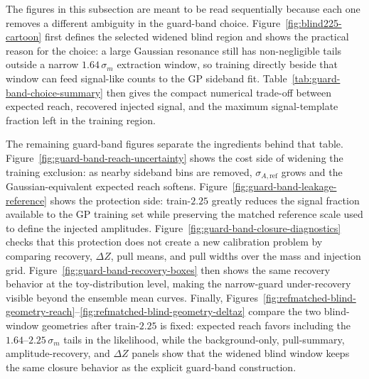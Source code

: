 The figures in this subsection are meant to be read sequentially because each one removes a different ambiguity in the guard-band choice. Figure~\ref{fig:blind225-cartoon} first defines the selected widened blind region and shows the practical reason for the choice: a large Gaussian resonance still has non-negligible tails outside a narrow $1.64\,\sigma_m$ extraction window, so training directly beside that window can feed signal-like counts to the GP sideband fit. Table~\ref{tab:guard-band-choice-summary} then gives the compact numerical trade-off between expected reach, recovered injected signal, and the maximum signal-template fraction left in the training region.

The remaining guard-band figures separate the ingredients behind that table. Figure~\ref{fig:guard-band-reach-uncertainty} shows the cost side of widening the training exclusion: as nearby sideband bins are removed, $\sigma_{A,\mathrm{ref}}$ grows and the Gaussian-equivalent expected reach softens. Figure~\ref{fig:guard-band-leakage-reference} shows the protection side: train-$2.25$ greatly reduces the signal fraction available to the GP training set while preserving the matched reference scale used to define the injected amplitudes. Figure~\ref{fig:guard-band-closure-diagnostics} checks that this protection does not create a new calibration problem by comparing recovery, $\Delta Z$, pull means, and pull widths over the mass and injection grid. Figure~\ref{fig:guard-band-recovery-boxes} then shows the same recovery behavior at the toy-distribution level, making the narrow-guard under-recovery visible beyond the ensemble mean curves. Finally, Figures~\ref{fig:refmatched-blind-geometry-reach}--\ref{fig:refmatched-blind-geometry-deltaz} compare the two blind-window geometries after train-$2.25$ is fixed: expected reach favors including the $1.64$--$2.25\,\sigma_m$ tails in the likelihood, while the background-only, pull-summary, amplitude-recovery, and $\Delta Z$ panels show that the widened blind window keeps the same closure behavior as the explicit guard-band construction.

